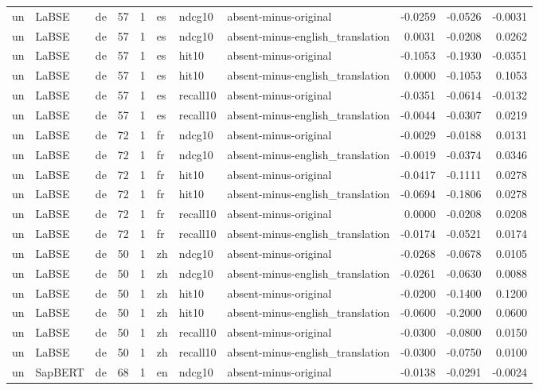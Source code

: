 \begin{tabular}{lllrrlllrrr}
un & LaBSE & de & 57 & 1 & es & ndcg10 & absent-minus-original & -0.0259 & -0.0526 & -0.0031 \\
un & LaBSE & de & 57 & 1 & es & ndcg10 & absent-minus-english\_translation & 0.0031 & -0.0208 & 0.0262 \\
un & LaBSE & de & 57 & 1 & es & hit10 & absent-minus-original & -0.1053 & -0.1930 & -0.0351 \\
un & LaBSE & de & 57 & 1 & es & hit10 & absent-minus-english\_translation & 0.0000 & -0.1053 & 0.1053 \\
un & LaBSE & de & 57 & 1 & es & recall10 & absent-minus-original & -0.0351 & -0.0614 & -0.0132 \\
un & LaBSE & de & 57 & 1 & es & recall10 & absent-minus-english\_translation & -0.0044 & -0.0307 & 0.0219 \\
un & LaBSE & de & 72 & 1 & fr & ndcg10 & absent-minus-original & -0.0029 & -0.0188 & 0.0131 \\
un & LaBSE & de & 72 & 1 & fr & ndcg10 & absent-minus-english\_translation & -0.0019 & -0.0374 & 0.0346 \\
un & LaBSE & de & 72 & 1 & fr & hit10 & absent-minus-original & -0.0417 & -0.1111 & 0.0278 \\
un & LaBSE & de & 72 & 1 & fr & hit10 & absent-minus-english\_translation & -0.0694 & -0.1806 & 0.0278 \\
un & LaBSE & de & 72 & 1 & fr & recall10 & absent-minus-original & 0.0000 & -0.0208 & 0.0208 \\
un & LaBSE & de & 72 & 1 & fr & recall10 & absent-minus-english\_translation & -0.0174 & -0.0521 & 0.0174 \\
un & LaBSE & de & 50 & 1 & zh & ndcg10 & absent-minus-original & -0.0268 & -0.0678 & 0.0105 \\
un & LaBSE & de & 50 & 1 & zh & ndcg10 & absent-minus-english\_translation & -0.0261 & -0.0630 & 0.0088 \\
un & LaBSE & de & 50 & 1 & zh & hit10 & absent-minus-original & -0.0200 & -0.1400 & 0.1200 \\
un & LaBSE & de & 50 & 1 & zh & hit10 & absent-minus-english\_translation & -0.0600 & -0.2000 & 0.0600 \\
un & LaBSE & de & 50 & 1 & zh & recall10 & absent-minus-original & -0.0300 & -0.0800 & 0.0150 \\
un & LaBSE & de & 50 & 1 & zh & recall10 & absent-minus-english\_translation & -0.0300 & -0.0750 & 0.0100 \\
un & SapBERT & de & 68 & 1 & en & ndcg10 & absent-minus-original & -0.0138 & -0.0291 & -0.0024 \\

\end{tabular}
